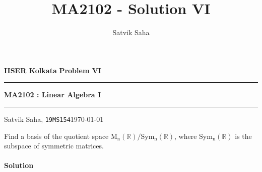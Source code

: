 \documentclass[10pt]{article}
\title{MA2102 - Solution VI}
\author{Satvik Saha}
\date{}
\def\MnR{\operatorname{M_n(\mathbb{R})}}
\def\Sym{\operatorname{Sym_n(\mathbb{R})}}
\begin{document}
        \par\textbf{IISER Kolkata} \hfill \textbf{Problem VI}
        \vspace{3pt}
        \hrule
        \vspace{3pt}
        \begin{center}
                \LARGE{\textbf{MA2102 : Linear Algebra I}}
        \end{center}
        \vspace{3pt}
        \hrule
        \vspace{3pt}
        Satvik Saha, \texttt{19MS154}\hfill\today
        \vspace{20pt}

        Find a basis of the quotient space $\MnR/\Sym$, where $\Sym$ is the subspace of symmetric matrices.

        \paragraph{Solution}
        
\end{document}
